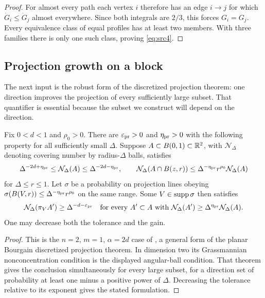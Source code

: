 \begin{proof}
For almost every path each vertex $i$ therefore has an edge $i\to j$
for which $\dot G_i\le\dot G_j$ almost everywhere.  Since both
integrals are $2/3$, this forces $G_i=G_j$.  Every equivalence class
of equal profiles has at least two members.  With three families
there is only one such class, proving \eqref{eq:src4}.
\end{proof}

\subsection{Projection growth on a block}

The next input is the robust form of the discretized projection theorem:
one direction improves the projection of every sufficiently large subset.
That quantifier is essential because the subset we construct will depend
on the direction.

\begin{lemma}\label{lem:transverse-projection}
Fix $0<d<1$ and $\rho_0>0$.  There are $\varepsilon_{\rm pr}>0$
and $\eta_{\rm pr}>0$ with the following property for all sufficiently
small $\Delta$.  Suppose $A\subset B(0,1)\subset\mathbb R^2$, with
$\mathcal N_\Delta$ denoting covering number by radius-$\Delta$ balls,
satisfies
\[
 \Delta^{-2d+\eta_{\rm pr}}\le\mathcal N_\Delta(A)
       \le\Delta^{-2d-\eta_{\rm pr}},\qquad
 \mathcal N_\Delta(A\cap B(z,r))
       \le\Delta^{-\eta_{\rm pr}}r^{\rho_0}
                                  \mathcal N_\Delta(A)
\]
for $\Delta\le r\le1$.  Let $\sigma$ be a probability on projection
lines obeying
$\sigma(B(V,r))\le\Delta^{-\eta_{\rm pr}}r^{\rho_0}$ on the same
range.  Some $V\in\operatorname{supp}\sigma$ then satisfies
\[
 \mathcal N_\Delta(\pi_V A')\ge\Delta^{-d-\varepsilon_{\rm pr}}
 \quad\hbox{for every }A'\subset A\hbox{ with }
 \mathcal N_\Delta(A')\ge\Delta^{\eta_{\rm pr}}
                                      \mathcal N_\Delta(A).
\]
One may decrease both the tolerance and the gain.
\end{lemma}

\begin{proof}
This is the $n=2$, $m=1$, $\alpha=2d$ case of
\cite[Theorem~1]{He20}, a general form of the planar Bourgain
discretized projection theorem.  In dimension two its Grassmannian
nonconcentration condition is the displayed angular-ball condition.
That theorem gives the conclusion simultaneously for every large
subset, for a direction set of probability at least one minus a
positive power of $\Delta$.  Decreasing the tolerance relative to
its exponent gives the stated formulation.
\end{proof}

